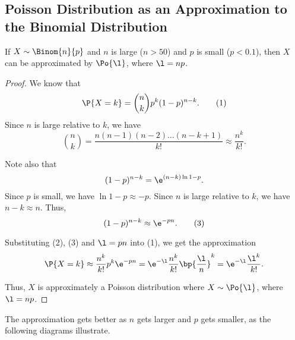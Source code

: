 \subsection{Poisson Distribution as an Approximation to the Binomial Distribution}

\begin{proposition}
    If $X \sim \Binom{n}{p}$ and $n$ is large ($n > 50$) and $p$ is small ($p < 0.1$), then $X$ can be approximated by $\Po{\l}$, where $\l = np$.
\end{proposition}
\begin{proof}
    We know that \[\P{X = k} = \binom{n}{k} p^k (1 - p)^{n-k}. \tag{1}\] Since $n$ is large relative to $k$, we have \[\binom{n}{k} = \frac{n(n-1)(n-2)\dots(n-k+1)}{k!} \approx \frac{n^k}{k!}. \tag{2}\]
    
    Note also that \[(1-p)^{n-k} = \e^{(n-k) \ln{1-p}}.\] Since $p$ is small, we have $\ln{1-p} \approx -p$. Since $n$ is large relative to $k$, we have $n-k \approx n$. Thus, \[(1-p)^{n-k} \approx \e^{-pn}. \tag{3}\]

    Substituting (2), (3) and $\l = pn$ into (1), we get the approximation \[\P{X = k} \approx \frac{n^k}{k!} p^k \e^{-pn} = \e^{-\l} \frac{n^k}{k!} \bp{\frac{\l}{n}}^k = \e^{-\l} \frac{\l^k}{k!}.\]

    Thus, $X$ is approximately a Poisson distribution where $X \sim \Po{\l}$, where $\l = np$.
\end{proof}

The approximation gets better as $n$ gets larger and $p$ gets smaller, as the following diagrams illustrate.


